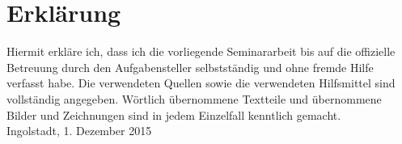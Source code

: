 \chapter*{Erklärung}
Hiermit erkläre ich, dass ich die vorliegende Seminararbeit bis auf die offizielle Betreuung durch den Aufgabensteller selbstständig und ohne fremde Hilfe verfasst habe.\absatz
Die verwendeten Quellen sowie die verwendeten Hilfsmittel sind vollständig angegeben. Wörtlich übernommene Textteile und übernommene Bilder und Zeichnungen sind in jedem Einzelfall kenntlich gemacht. \\[10ex]
Ingolstadt, 1. Dezember 2015
